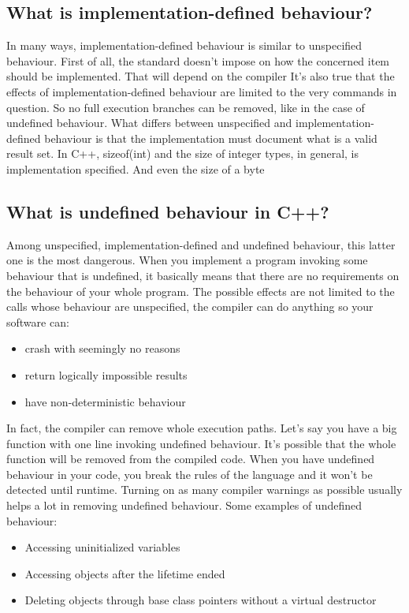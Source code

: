 \documentclass{report}
\begin{document}
\subsection{What is implementation-defined behaviour?}
\bigbreak \noindent 
In many ways, implementation-defined behaviour is similar to
unspecified behaviour. First of all, the standard doesn’t impose on
how the concerned item should be implemented. That will depend
on the compiler
\bigbreak \noindent 
It’s also true that the effects of implementation-defined behaviour
are limited to the very commands in question. So no full execution
branches can be removed, like in the case of undefined behaviour.
\bigbreak \noindent 
What differs between unspecified and implementation-defined behaviour is that the implementation must document what is a valid
result set.
\bigbreak \noindent 
In C++, sizeof(int) and the size of integer types, in general, is
implementation specified. And even the size of a byte

\bigbreak \noindent 
\subsection{What is undefined behaviour in C++?}
\bigbreak \noindent 
Among unspecified, implementation-defined and undefined behaviour, this latter one is the most dangerous.
\bigbreak \noindent 
When you implement a program invoking some behaviour that is
undefined, it basically means that there are no requirements on
the behaviour of your whole program. The possible effects are not
limited to the calls whose behaviour are unspecified, the compiler
can do anything so your software can:
\begin{itemize}
    \item crash with seemingly no reasons
    \item return logically impossible results
    \item have non-deterministic behaviour
\end{itemize}
\bigbreak \noindent 
In fact, the compiler can remove whole execution paths. Let’s
say you have a big function with one line invoking undefined
behaviour. It’s possible that the whole function will be removed
from the compiled code.
\bigbreak \noindent 
When you have undefined behaviour in your code, you break
the rules of the language and it won’t be detected until runtime.
Turning on as many compiler warnings as possible usually helps a
lot in removing undefined behaviour.
\bigbreak \noindent 
Some examples of undefined behaviour:
\begin{itemize}
    \item Accessing uninitialized variables
    \item Accessing objects after the lifetime ended
    \item Deleting objects through base class pointers without a virtual destructor
\end{itemize}
\bigbreak \noindent 
\end{document}
